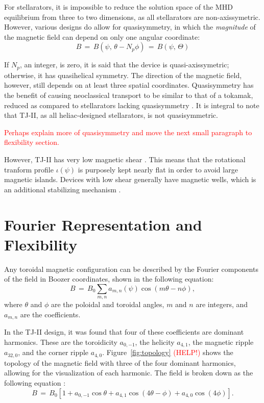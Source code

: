 \documentclass[a4paper]{article}
\newcommand\mynotes[1]{\textcolor{red}{#1}}
\begin{document}
For stellarators, it is impossible to reduce the solution space of the MHD equilibrium from three to two dimensions, as all stellarators are non-axissymetric.
However, various designs do allow for quasisymmetry, in which the \emph{magnitude} of the magnetic field can depend on only one angular coordinate:
\begin{equation}
	B \,=\, B(\psi,\,\theta - N_p\phi) \,=\, B(\psi,\,\Theta)
\end{equation}

If $N_p$, an integer, is zero, it is said that the device is quasi-axissymetric; otherwise, it has quasihelical symmetry.
The direction of the magnetic field, however, still depends on at least three spatial coordinates.
Quasisymmetry has the benefit of causing neoclassical transport to be similar to that of a tokamak, reduced as compared to stellarators lacking quasisymmetry \cite{boozer_what_1998}.
It is integral to note that TJ-II, as all heliac-designed stellarators, is not quasisymmetric.

\mynotes{Perhaps explain more of quasisymmetry and move the next small paragraph to flexibility section.}

However, TJ-II has very low magnetic shear \cite{milligen_mhd_2012}.
This means that the rotational tranform profile $\iota(\psi)$ is purposely kept nearly flat in order to avoid large magnetic islands.
Devices with low shear generally have magnetic wells, which is an additional stabilizing mechanism \cite{aguilera_magnetic_2015}.


\section*{Fourier Representation and Flexibility}
Any toroidal magnetic configuration can be described by the Fourier components of the field in Boozer coordinates, shown in the following equation:
\begin{equation*}
	B \,=\, B_0 \sum_{m,n} a_{m,n}\left(\psi\right) \cos\left(m\theta - n\phi\right),
\end{equation*}
where $\theta$ and $\phi$ are the poloidal and toroidal angles, $m$ and $n$ are integers, and $a_{m,n}$ are the coefficients.

In the TJ-II design, it was found that four of these coefficients are dominant harmonics.
These are the toroidicity $a_{0,-1}$, the helicity $a_{4,1}$, the magnetic ripple $a_{32,0}$, and the corner ripple $a_{4,0}$.
Figure~\ref{fig:topology} \mynotes{(HELP!)} shows the topology of the magnetic field with three of the four dominant harmonics, allowing for the visualization of each harmonic. The field is broken down as the following equation \cite{solano_study_1988}:
\begin{equation}
	B \,=\,B_0\left[1 + a_{0,-1}\cos\theta + a_{4,1}\cos\left(4\theta - \phi\right) + a_{4,0}\cos\left(4\phi\right)\right].
\end{equation}
\end{document}
